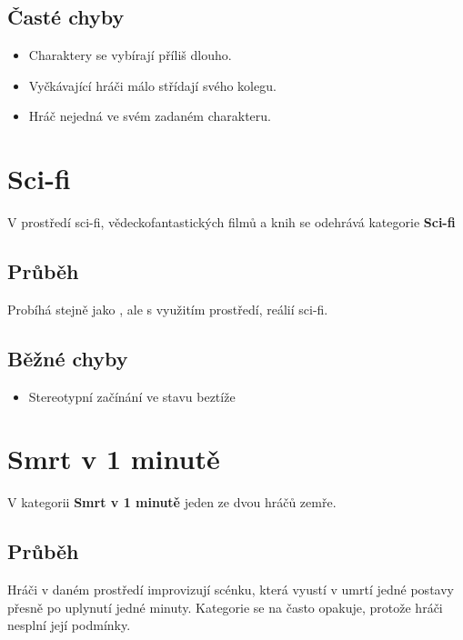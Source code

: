 \documentclass[main.tex]{subfiles}
\begin{document}
\subsection{ Časté chyby } \begin{itemize}
\item Charaktery se vybírají příliš dlouho.
\item Vyčkávající hráči málo střídají svého kolegu.
\item Hráč nejedná ve svém zadaném charakteru.
\end{itemize}
 
 
 
 
 
\needspace{5cm} \section{Sci-fi} \label{sci-fi}  
V prostředí sci-fi, vědeckofantastických filmů a knih se odehrává kategorie \textbf{Sci-fi}{} 
 
\subsection{Průběh} Probíhá stejně jako , ale s využitím prostředí, reálií sci-fi.  
\subsection{Běžné chyby} \begin{itemize}
\item Stereotypní začínání ve stavu beztíže
\end{itemize}
 
 
 
 
\needspace{5cm} \section{Smrt v 1 minutě} \label{smrt v 1 minutě}  
 
 
V kategorii \textbf{Smrt v 1 minutě}{} jeden ze dvou hráčů zemře. 
 
\subsection{Průběh} Hráči v daném prostředí improvizují scénku, která vyustí v umrtí jedné postavy přesně po uplynutí jedné minuty. Kategorie se na  často opakuje, protože hráči nesplní její podmínky. 
 
\end{document}
